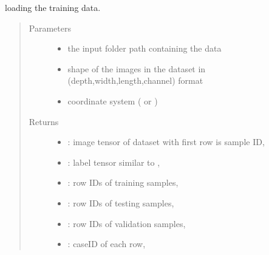 \documentclass[letterpaper,10pt,english]{sphinxmanual}
\begin{document}
\begin{fulllineitems}
\label{\detokenize{index:util.load_data.load_train_data}}
loading the training data.
\begin{quote}\begin{description}
\item[{Parameters}] \leavevmode\begin{itemize}
\item {} 
 \textendash{} the input folder path containing the data

\item {} 
 \textendash{} shape of the images in the dataset in (depth,width,length,channel) format

\item {} 
 \textendash{} coordinate system ( or )

\end{itemize}

\item[{Returns}] \leavevmode
\begin{itemize}
\item {} 
: image tensor of dataset with first row is sample ID,

\item {} 
: label tensor similar to ,

\item {} 
: row IDs of training samples,

\item {} 
: row IDs of testing samples,

\item {} 
: row IDs of validation samples,

\item {} 
: caseID of each row,

\end{itemize}


\end{description}\end{quote}




{\hyperref[\detokenize{index:util.load_data.make_dataset}]{}}



\end{fulllineitems}
\end{document}

